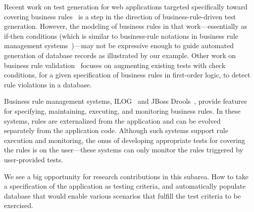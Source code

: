 Recent work on test generation for web applications targeted specifically toward
covering business rules~\cite{Thummalapenta:2013} is a step in the direction of
business-rule-driven test generation. However, the modeling of business rules in
that work---essentially as if-then conditions (which is similar to business-rule
notations in business rule management systems~\cite{drools,ilog})---may not be
expressive enough to guide automated generation of database records as
illustrated by our example. Other work on business rule
validation~\cite{Willmor:2006} focuses on augmenting existing tests with check
conditions, for a given specification of business rules in first-order logic, to
detect rule violations in a database.

Business rule management systems, \eg ILOG~\cite{ilog} and JBoss
Drools~\cite{drools}, provide features for specifying, maintaining, executing,
and monitoring business rules. In these systems, rules are externalized from the
application and can be evolved separately from the application code.  Although
such systems support rule execution and monitoring, the onus of developing
appropriate tests for covering the rules is on the user---these systems can only
monitor the rules triggered by user-provided tests.

We see a big opportunity for research contributions in this subarea. How to take
a specification of the application as testing criteria, and automatically
populate database that would enable various scenarios that fulfill the test
criteria to be exercised.
